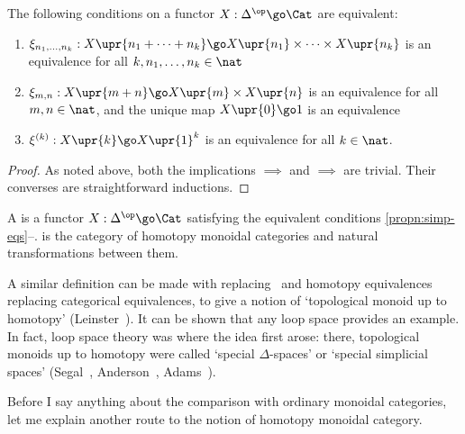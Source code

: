 \begin{propn}	
The following conditions on a functor $X: \Delta^\op \go \Cat$ are
equivalent: 
%
\begin{enumerate}
\item	{}
$\xi_{n_1, \ldots, n_k}: 
X\upr{n_1 + \cdots + n_k} 
\go 
X\upr{n_1} \times\cdots\times X\upr{n_k}$
is an equivalence for all $k, n_1, \ldots, n_k \in \nat$
\item 	{}
$\xi_{m,n}: X\upr{m+n} \go X\upr{m} \times X\upr{n}$
is an equivalence for all $m, n \in \nat$, and the unique map $X\upr{0} \go
1$ is an equivalence
\item 	{}
$\xi^{(k)}: X\upr{k} \go X\upr{1}^k$
is an equivalence for all $k\in\nat$.
\end{enumerate}
\end{propn}

\begin{proof}
As noted above, both the implications
$\implies$ and 
$\implies$ are
trivial.  Their converses are straightforward inductions.
\done
\end{proof}

\begin{defn}%
%
%
A  is a functor $X: \Delta^\op \go \Cat$
satisfying the equivalent conditions
\ref{propn:simp-eqs}--.
%
% 
% 
is the category of homotopy monoidal categories and natural
transformations between them.
\end{defn}

A similar definition can be made with  replacing \Cat\ and
homotopy equivalences replacing categorical equivalences, to give a notion
of `topological monoid%
%
%
up to homotopy' (Leinster~\cite[\S 4]{UTHM}).  It
can be shown that any loop%
%
%
space provides an example.  In fact, loop space
theory was where the idea first arose: there, topological monoids up to
homotopy were called `special $\Delta$-spaces'%
%
%
%
%
%
%
or `special simplicial
spaces' (Segal~\cite{SegCCT},%
%
%
Anderson~\cite{And},
Adams~\cite[p.~63]{Ad}). 

Before I say anything about the comparison with ordinary monoidal
categories, let me explain another route to the notion of homotopy monoidal
category.  

